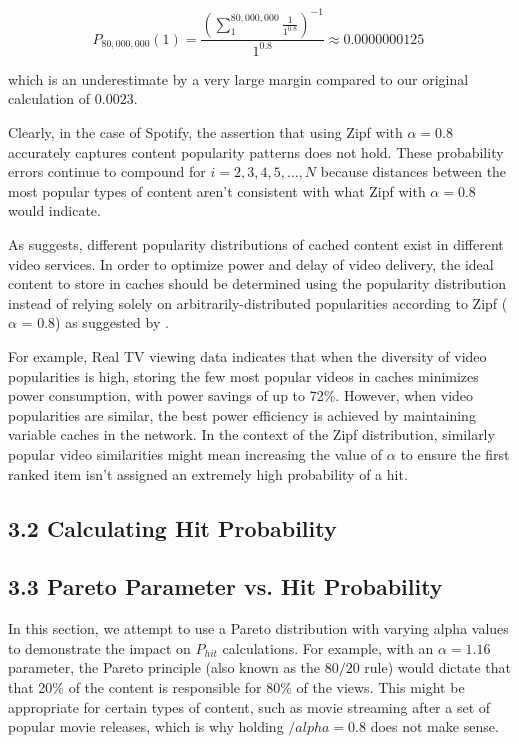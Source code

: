 \documentclass[
	a4paper, %
	10pt, %
	unnumberedsections, %
	twoside, %
]{LTJournalArticle}
\begin{document}
\[
	P_{80,000,000}(1) = \frac{\left(\sum_{1}^{80,000,000} \frac{1}{1^{0.8}}
	\right)^{-1}}{1^{0.8}} \approx 0.0000000125 \
\] 

which is an underestimate by a very large margin compared to our original calculation of $0.0023$.

Clearly, in the case of Spotify, the assertion that using Zipf with $\alpha = 0.8$ accurately captures content popularity patterns does not hold. These probability errors continue to compound for $i = 2, 3, 4, 5, \ldots, N$ because distances between the most popular types of content aren't consistent with what Zipf with $\alpha = 0.8$ would indicate. 

As \cite{osmanthesis} suggests, different popularity distributions of cached content exist in different video services. In order to optimize power and delay of video delivery, the ideal content to store in caches should be determined using the popularity distribution instead of relying solely on arbitrarily-distributed popularities according to Zipf ($\alpha$ = 0.8) as suggested by \cite{biancoCDNs2017}. 

For example, Real TV viewing data indicates that when the diversity of video popularities is high, storing the few most popular videos in caches minimizes power consumption, with power savings of up to 72\%. However, when video popularities are similar, the best power efficiency is achieved by maintaining variable caches in the network. In the context of the Zipf distribution, similarly popular video similarities might mean increasing the value of $\alpha$ to ensure the first ranked item isn't assigned an extremely high probability of a hit.


\subsection{3.2 Calculating Hit Probability}



\subsection{3.3 Pareto Parameter vs. Hit Probability}

In this section, we attempt to use a Pareto distribution with varying alpha values to demonstrate the impact on $P_{hit}$ calculations. For example, with an $\alpha = 1.16$ parameter, the Pareto principle (also known as the $80/20$ rule) would dictate that that 20\% of the content is responsible for 80\% of the views. This might be appropriate for certain types of content, such as movie streaming after a set of popular movie releases, which is why holding $/alpha = 0.8$ does not make sense. 
\end{document}
